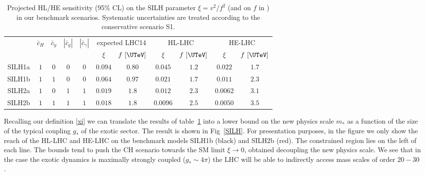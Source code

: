 \begin{table}[t]
\caption{\small Projected HL/HE sensitivity (95\% CL) on the SILH parameter $\xi=v^2/f^2$ (and on $f$ in \UTeV) in our benchmark scenarios. Systematic uncertainties are treated according to the conservative scenario S1.
\label{bencharkVecchi}}
\begin{center}
{
\begin{tabular}{c|cccc||cc|cc|cc} 
\rule{0pt}{1.2em}%
\multirow{ 2}{*}{} & \multirow{ 2}{*}{$\bar c_H$} & \multirow{ 2}{*}{$\bar c_y$} & \multirow{ 2}{*}{$|\bar c_{g}|$} & \multirow{ 2}{*}{$|\bar c_{\gamma}|$} & \multicolumn{2}{c|}{expected LHC14}  & \multicolumn{2}{c|}{HL-LHC} &  \multicolumn{2}{c}{HE-LHC} \\
&  &   &  &  & $\xi$ & $f~[{\rm \UTeV}]$  & $\xi$  & $f~[{\rm \UTeV}]$ &  $\xi$ & $f~[{\rm \UTeV}]$ \\
\hline
\hline
SILH1a & $1$ & $0$ & $0$ & $0$ & $0.094$ & $0.80$ &      $0.045$ & $1.2$ & $0.022$ & $1.7$ \\
SILH1b &$1$ & $1$ & $0$ & $0$ & $0.064$ & $0.97$ &       $0.021$ & $1.7$ & $0.011$ & $2.3$ \\
\hline
SILH2a &$1$ & $0$ & $1$ & $1$ & $0.019$ & $1.8$ &       $0.012$ & $2.3$ & $0.0062$ & $3.1$\\
SILH2b & $1$ & $1$ & $1$ & $1$ & $0.018$ & $1.8$ &       $0.0096$ & $2.5$ & $0.0050$ & $3.5$ \\
\end{tabular}
}
\end{center}
\end{table}








Recalling our definition \eqref{xi} we can translate the results of table~\ref{bencharkVecchi} into a lower bound on the new physics scale $m_*$ as a function of the size of the typical coupling $g_*$ of the exotic sector. The result is shown in Fig~\ref{SILH}. For presentation purposes, in the figure we only show the reach of the HL-LHC and HE-LHC on the benchmark models SILH1b (black) and SILH2b (red). The constrained region lies on the left of each line. The bounds tend to push the CH scenario towards the SM limit $\xi\to0$, obtained decoupling the new physics scale. We see that in the case the exotic dynamics is maximally strongly coupled ($g_*\sim4\pi$) the LHC will be able to indirectly access mass scales of order $20-30$ \UTeV.

